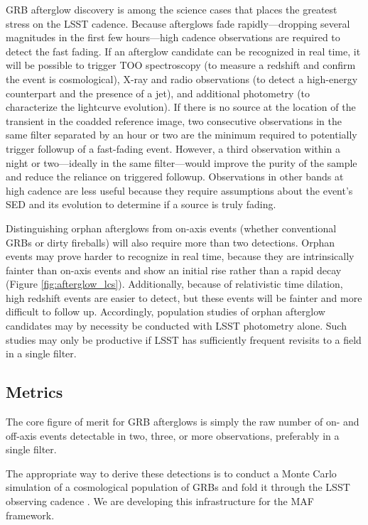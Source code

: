 GRB afterglow discovery is among the science cases that places the
greatest stress on the LSST cadence.  Because afterglows fade
rapidly---dropping several magnitudes in the first few hours---high
cadence observations are required to detect the fast fading. If an
afterglow candidate can be recognized in real time, it will be possible
to trigger TOO spectroscopy (to measure a redshift and confirm the event
is cosmological), X-ray and radio observations (to detect a high-energy
counterpart and the presence of a jet), and additional photometry (to
characterize the lightcurve evolution).  If there is no source at the
location of the transient in the coadded reference image, two
consecutive observations in the same filter separated by an hour or two
are the minimum required to potentially trigger followup of a
fast-fading event. However, a third observation within a night or
two---ideally in the same filter---would improve the purity of the
sample and reduce the reliance on triggered followup. Observations in
other bands at high cadence are less useful because they require
assumptions about the event's SED and its evolution to determine if a
source is truly fading.

Distinguishing orphan afterglows from on-axis events (whether conventional
GRBs or dirty fireballs) will also require more than two detections.
Orphan events may prove harder to recognize in real time, because they are
intrinsically fainter than on-axis events and show an initial rise rather
than a rapid decay (Figure \ref{fig:afterglow_lcs}).  Additionally, because
of relativistic time dilation, high redshift events are easier to detect,
but these events will be fainter and more difficult to follow up.
Accordingly, population studies of orphan afterglow candidates may by
necessity be conducted with LSST photometry alone.  Such studies may only
be productive if LSST has sufficiently frequent revisits to a field in a
single filter.


\subsection{Metrics}
\label{sec:\secname:metrics}

The core figure of merit for GRB afterglows is simply the raw number of
on- and off-axis events detectable in two, three, or more observations,
preferably in a single filter.

The appropriate way to derive these detections is to conduct a Monte
Carlo simulation of a cosmological population of GRBs and fold it
through the LSST observing cadence \citep[cf.][]{2011PASP..123.1034J}.
We are developing this infrastructure for the MAF framework.

